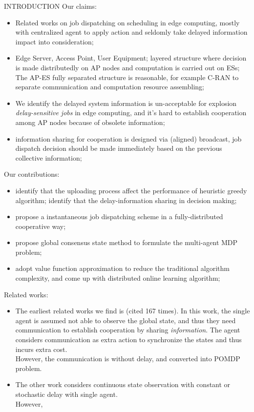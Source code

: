 \documentclass[10pt, conference, letterpaper]{IEEEtran}
\begin{document}
    \begin{section}{INTRODUCTION}
        \label{sec:introduction}
        Our claims:
        \begin{itemize}
            \item Related works on job dispatching on scheduling in edge computing, mostly with centralized agent to apply action and seldomly take delayed information impact into consideration;
            \item Edge Server, Access Point, User Equipment; layered structure where decision is made distributedly on AP nodes and computation is carried out on ESs; The AP-ES fully separated structure is reasonable, for example C-RAN to separate communication and computation resource assembling;
            \item We identify the delayed system information is un-acceptable for explosion \emph{delay-sensitive jobs} in edge computing, and it's hard to establish cooperation among AP nodes because of obsolete information;
            \item information sharing for cooperation is designed via (aligned) broadcast, job dispatch decision should be made immediately based on the previous collective information;
        \end{itemize}

        Our contributions:
        \begin{itemize}
            \item identify that the uploading process affect the performance of heuristic greedy algorithm; identify that the delay-information sharing in decision making;
            \item propose a instantaneous job dispatching scheme in a fully-distributed cooperative way;
            \item propose global consensus state method to formulate the multi-agent MDP problem;
            \item adopt value function approximation to reduce the traditional algorithm complexity, and come up with distributed online learning algorithm;
        \end{itemize}

        Related works:
        \begin{itemize}
            \item The earliest related works we find is \cite{ref-01} (cited 167 times). In this work, the single agent is assumed not able to observe the global state, and thus they need communication to establish cooperation by sharing \emph{information}. The agent considers communication as extra action to synchronize the states and thus incurs extra cost. \\
            However, the communication is without delay, and converted into POMDP problem.
            \item The other work \cite{ref-02} considers continuous state observation with constant or stochastic delay with single agent. \\
            However, 
        \end{itemize}

    \end{section}
\end{document}
